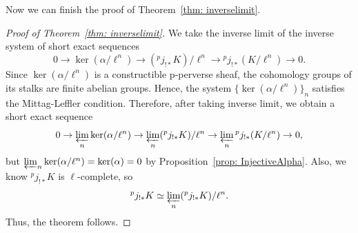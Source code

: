 Now we can finish the proof of Theorem~\ref{thm: inverselimit}.
\begin{proof}[Proof of Theorem~\ref{thm: inverselimit}]
    We take the inverse limit of the inverse system of short exact sequences
    \[0\to\operatorname{ker}(\alpha/\ell^n)\to ({}^pj_{!\ast}K)/\ell^n\to {}^pj_{!\ast}(K/\ell^n)\to 0.\]
    Since $\operatorname{ker}(\alpha/\ell^n)$ is a constructible p-perverse sheaf, the cohomology groups of its stalks are finite abelian groups. Hence, the system $\{\operatorname{ker}(\alpha/\ell^n)\}_n$ satisfies the Mittag-Leffler condition. Therefore, after taking inverse limit, we obtain a short exact sequence
    \[0\to\varprojlim_n\operatorname{ker}(\alpha/\ell^n)\to \varprojlim_n({}^pj_{!\ast}K)/\ell^n\to \varprojlim_n{}^pj_{!\ast}(K/\ell^n)\to 0, \]
    but $\varprojlim_n\operatorname{ker}(\alpha/\ell^n)=\operatorname{ker}(\alpha)=0$ by Proposition~\ref{prop: InjectiveAlpha}. Also, we know ${}^pj_{!\ast}K$ is $\ell$-complete, so 
    \[{}^pj_{!\ast}K\simeq \varprojlim_n ({}^pj_{!\ast}K)/\ell^n.\] 
    Thus, the theorem follows.
\end{proof}